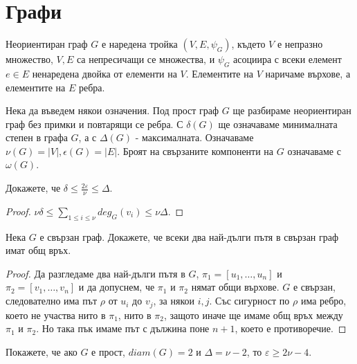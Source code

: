 \chapter{Графи}
\label{chap:graph}



\begin{dfn}
  Неориентиран граф $G$ е наредена тройка $(V,E,\psi_G)$, където
  $V$ е непразно множество, $V,E$ са непресичащи се множества, и $\psi_G$ асоциира с всеки елемент $e\in E$
  ненаредена двойка от елементи на $V$.
  Елементите на $V$ наричаме върхове, а елементите на $E$ ребра.
\end{dfn}

Нека да въведем някои означения.
Под прост граф $G$ ще разбираме неориентиран граф без примки и повтарящи се ребра.
С $\delta(G)$ ще означаваме минималната степен в графа $G$, а с $\Delta(G)$ - максималната.
Означаваме $\nu(G) = |V|, \epsilon(G) = |E|$.
Броят на свързаните компоненти на $G$ означаваме с $\omega(G)$.

\begin{problem}
  Докажете, че $\delta \leq \frac{2\varepsilon}{\nu} \leq \Delta$.
\end{problem}
\begin{proof}
  $\nu\delta \leq\sum_{1\leq i \leq\nu} deg_G(v_i) \leq \nu\Delta$.
\end{proof}

\begin{problem}
  Нека $G$ е свързан граф.
  Докажете, че всеки два най-дълги пътя в свързан граф имат общ връх.
\end{problem}
\begin{proof}
  Да разгледаме два най-дълги пътя в $G$, $\pi_1 = [u_1,\dots,u_n]$ и $\pi_2 = [v_1,\dots,v_n]$ и да допуснем, че $\pi_1$ и $\pi_2$
  нямат общи върхове.
  $G$ е свързан, следователно има път $\rho$ от $u_i$ до $v_j$, за някои $i,j$.
  Със сигурност по $\rho$ има ребро, което не участва нито в $\pi_1$, нито в $\pi_2$, защото иначе ще имаме общ връх между $\pi_1$ и $\pi_2$.
  Но така пък имаме път с дължина поне $n+1$, което е противоречие.
\end{proof}

\begin{problem}%
  Покажете, че ако $G$ е прост, $diam(G) = 2$ и $\Delta = \nu - 2$, то $\varepsilon \geq 2\nu - 4$.
\end{problem}

